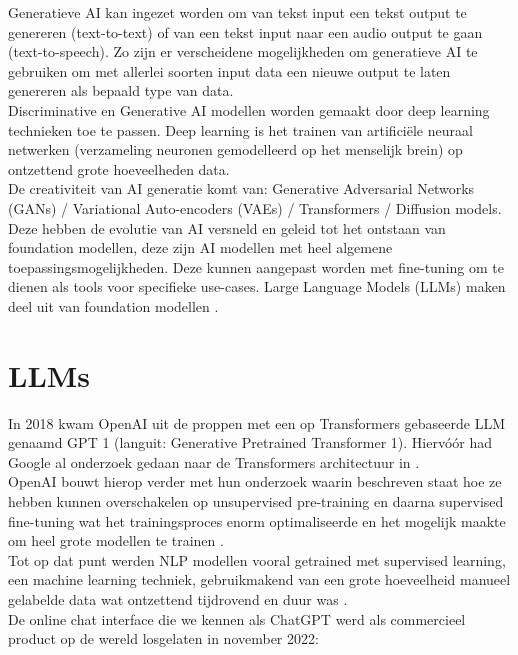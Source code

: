 Generatieve AI kan ingezet worden om van tekst input een tekst output te genereren (text-to-text) of van een tekst input naar een audio output te gaan (text-to-speech).
Zo zijn er verscheidene mogelijkheden om generatieve AI te gebruiken om met allerlei soorten input data een nieuwe output te laten genereren als bepaald type van data. \\

Discriminative en Generative AI modellen worden gemaakt door deep learning technieken toe te passen. Deep learning is het trainen van artificiële neuraal netwerken (verzameling neuronen gemodelleerd op het menselijk brein) op ontzettend grote hoeveelheden data. \\

De creativiteit van AI generatie komt van: Generative Adversarial Networks (GANs) / Variational Auto-encoders (VAEs) / Transformers / Diffusion models. Deze hebben de evolutie van AI versneld en geleid tot het ontstaan van foundation modellen, deze zijn AI modellen met heel algemene toepassingsmogelijkheden. Deze kunnen aangepast worden met fine-tuning om te dienen als tools voor specifieke use-cases. Large Language Models (LLMs) maken deel uit van foundation modellen \autocite{Bommasani2021}.

\section{LLMs}
\label{sec:llms}
In 2018 kwam OpenAI uit de proppen met een op Transformers gebaseerde LLM genaamd GPT 1 (languit: Generative Pretrained Transformer 1). Hiervóór had Google al onderzoek gedaan naar de Transformers architectuur in \autocite{Vaswani2017}. \\
OpenAI bouwt hierop verder met hun onderzoek waarin beschreven staat hoe ze hebben kunnen overschakelen op unsupervised pre-training en daarna supervised fine-tuning wat het trainingsproces enorm optimaliseerde en het mogelijk maakte om heel grote modellen te trainen \autocite{Radford2018}. \\

Tot op dat punt werden NLP modellen vooral getrained met supervised learning, een machine learning techniek, gebruikmakend van een grote hoeveelheid manueel gelabelde data wat ontzettend tijdrovend en duur was \autocite{Radford2018}. \\

De online chat interface die we kennen als ChatGPT werd als commercieel product op de wereld losgelaten in november 2022:

